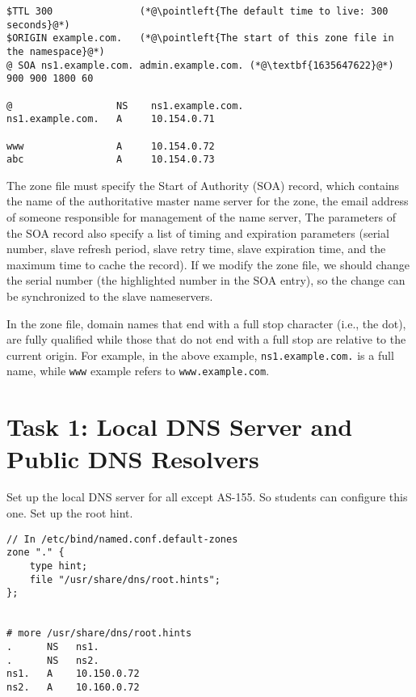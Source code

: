\begin{lstlisting}
$TTL 300               (*@\pointleft{The default time to live: 300 seconds}@*) 
$ORIGIN example.com.   (*@\pointleft{The start of this zone file in the namespace}@*) 
@ SOA ns1.example.com. admin.example.com. (*@\textbf{1635647622}@*) 900 900 1800 60

@                  NS    ns1.example.com.
ns1.example.com.   A     10.154.0.71

www                A     10.154.0.72
abc                A     10.154.0.73 
\end{lstlisting}

The zone file must specify the Start of Authority (SOA) record, which
contains the name of the authoritative master name server for the zone, 
the email address of someone responsible for management of the name server,
The parameters of the SOA record also specify a list of timing
and expiration parameters (serial number, slave refresh period, slave retry time, slave
expiration time, and the maximum time to cache the record). 
If we modify the zone file, we should change the serial number (the highlighted 
number in the SOA entry), so the change can be synchronized to the 
slave nameservers. 

In the zone file, domain names that end with a full stop character (i.e., the dot),
are fully qualified while those that do not end with a full stop are
relative to the current origin. 
For example, in the above example, \texttt{ns1.example.com.} is a full name,
while \texttt{www} example refers to \texttt{www.example.com}.



\section{Task 1: Local DNS Server and Public DNS Resolvers} 

Set up the local DNS server for all except AS-155.
So students can configure this one.
Set up the root hint.



\begin{lstlisting}
// In /etc/bind/named.conf.default-zones
zone "." {
	type hint;
	file "/usr/share/dns/root.hints";
};


# more /usr/share/dns/root.hints
.      NS   ns1.
.      NS   ns2.
ns1.   A    10.150.0.72
ns2.   A    10.160.0.72
\end{lstlisting}
 


